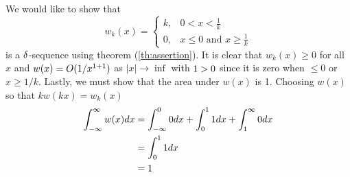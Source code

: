\begin{example}
    We would like to show that
    \begin{equation*}
        w_k(x) = \begin{cases}
            k, &  0<x<\frac{1}{k}\\
            0, &x\leq 0 \text{ and } x \geq \frac{1}{k}
        \end{cases}
    \end{equation*}
    is a \(\delta\)-sequence using theorem (\ref{th:assertion}). It is clear that \(w_k(x)\geq 0\)  for all \(x\) and \(w(x)=O(1/x^{1+1})\) as \(|x| \rightarrow \inf\) with \(1>0\) since it is zero when \(\leq 0\) or \(x \geq 1/k\). Lastly, we must show that the area under \(w(x)\) is 1. Choosing \(w(x)\) so that \(kw(kx)=w_k(x)\)
    \begin{equation}
        \begin{split}
            \int_{-\infty}^{\infty} w(x) dx &= \int_{-\infty}^{0} 0 dx +\int_0^1 1 dx + \int_{1}^{\infty} 0 dx\\
            &=\int_0^1 1 dx\\
            &=1
        \end{split}
    \end{equation}
\end{example}